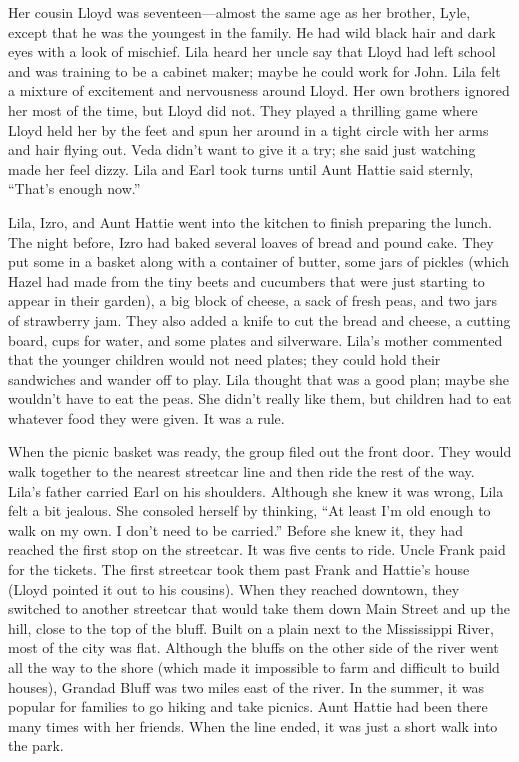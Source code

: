 \documentclass[
  american,
  letterpaper,
]{book}
\begin{document}
Her cousin Lloyd was seventeen---almost the same age as her brother,
Lyle, except that he was the youngest in the family. He had wild black
hair and dark eyes with a look of mischief. Lila heard her uncle say
that Lloyd had left school and was training to be a cabinet maker; maybe
he could work for John. Lila felt a mixture of excitement and
nervousness around Lloyd. Her own brothers ignored her most of the time,
but Lloyd did not. They played a thrilling game where Lloyd held her by
the feet and spun her around in a tight circle with her arms and hair
flying out. Veda didn't want to give it a try; she said just watching
made her feel dizzy. Lila and Earl took turns until Aunt Hattie said
sternly, ``That's enough now.''

Lila, Izro, and Aunt Hattie went into the kitchen to finish preparing
the lunch. The night before, Izro had baked several loaves of bread and
pound cake. They put some in a basket along with a container of butter,
some jars of pickles (which Hazel had made from the tiny beets and
cucumbers that were just starting to appear in their garden), a big
block of cheese, a sack of fresh peas, and two jars of strawberry jam.
They also added a knife to cut the bread and cheese, a cutting board,
cups for water, and some plates and silverware. Lila's mother commented
that the younger children would not need plates; they could hold their
sandwiches and wander off to play. Lila thought that was a good plan;
maybe she wouldn't have to eat the peas. She didn't really like them,
but children had to eat whatever food they were given. It was a rule.

When the picnic basket was ready, the group filed out the front door.
They would walk together to the nearest streetcar line and then ride the
rest of the way. Lila's father carried Earl on his shoulders. Although
she knew it was wrong, Lila felt a bit jealous. She consoled herself by
thinking, ``At least I'm old enough to walk on my own. I don't need to
be carried.'' Before she knew it, they had reached the first stop on the
streetcar. It was five cents to ride. Uncle Frank paid for the tickets.
The first streetcar took them past Frank and Hattie's house (Lloyd
pointed it out to his cousins). When they reached downtown, they
switched to another streetcar that would take them down Main Street and
up the hill, close to the top of the bluff. Built on a plain next to the
Mississippi River, most of the city was flat. Although the bluffs on the
other side of the river went all the way to the shore (which made it
impossible to farm and difficult to build houses), Grandad Bluff was two
miles east of the river. In the summer, it was popular for families to
go hiking and take picnics. Aunt Hattie had been there many times with
her friends. When the line ended, it was just a short walk into the
park.
\end{document}
